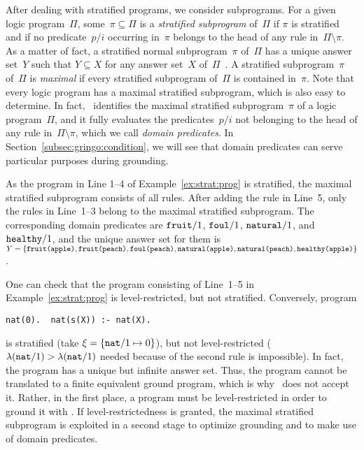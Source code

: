 After dealing with stratified programs, we consider subprograms.
For a given logic program~$\Pi$, some~$\pi\subseteq\Pi$ is a 
\emph{stratified subprogram} of~$\Pi$ if
$\pi$ is stratified and if
no predicate~$p/i$ occurring in~$\pi$ belongs to the head of any rule in~$\Pi\setminus\pi$.
As a matter of fact,
a stratified normal subprogram~$\pi$ of~$\Pi$ has a unique answer set~$Y$ such that
$Y\subseteq X$ for any answer set~$X$ of~$\Pi$~\cite{liftur94a}.
A stratified subprogram~$\pi$ of~$\Pi$ is \emph{maximal} if every stratified
subprogram of~$\Pi$ is contained in~$\pi$.
Note that every logic program has a maximal stratified subprogram,
which is also easy to determine.
In fact, \gringo\ identifies the maximal stratified subprogram~$\pi$
of a logic program~$\Pi$,
and it fully evaluates the predicates~$p/i$ not belonging to the head of any rule in~$\Pi\setminus\pi$,
which we call \emph{domain predicates}.
In Section~\ref{subsec:gringo:condition},
we will see that domain predicates can serve particular purposes during grounding.

\begin{example}\label{ex:strat:max}
As the program in Line 1--4 of Example~\ref{ex:strat:prog} is stratified,
the maximal stratified subprogram consists of all rules.
After adding the rule in Line~5,
only the rules in Line~1--3 belong to the maximal stratified subprogram.
The corresponding domain predicates are
$\texttt{fruit}/1$,
$\texttt{foul}/1$,
$\texttt{natural}/1$, and
$\texttt{healthy}/1$, 
and the unique answer set for them is
$
Y
=
\{
\code{\pred{fruit}(\const{apple})},\linebreak[1]
\code{\pred{fruit}(\const{peach})},\linebreak[1]
\code{\pred{foul}(\const{peach})},\linebreak[1]
\code{\pred{natural}(\const{apple})},\linebreak[1]
\code{\pred{natural}(\const{peach})},\linebreak[1]
\code{\pred{healthy}(\const{apple})}
\}
$.
\eexample
\end{example}

One can check that the program consisting of Line~1--5
in Example~\ref{ex:strat:prog} is level-restricted, but not stratified.
Conversely, program
\begin{lstlisting}[numbers=none]
nat(0).  nat(s(X)) :- nat(X).
\end{lstlisting}
is stratified (take $\xi=\{\texttt{nat}/1 \mapsto 0\}$),
but not level-restricted
($\lambda(\texttt{nat}/1)>\lambda(\texttt{nat}/1)$
 needed because of the second rule is impossible).
In fact, the program has a unique but infinite answer set.
Thus,
the program cannot be translated to a finite equivalent ground program,
which is why \gringo\ does not accept it.
Rather, in the first place, a program must be level-restricted in order
to ground it with \gringo.
If level-restrictedness is granted,
the maximal stratified subprogram is exploited in a second stage
to optimize grounding and to make use of domain predicates.

